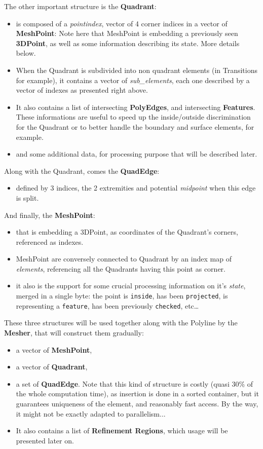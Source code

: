 \documentclass[10pt]{article}
\begin{document}
The other important structure is the \textbf{Quadrant}:
\begin{itemize}
\item is composed of a \textit{pointindex}, vector of 4 corner indices in a vector of \textbf{MeshPoint}: Note here that MeshPoint is embedding a previously seen \textbf{3DPoint}, as well as some information describing its state. More details below.
\item When the Quadrant is subdivided into non quadrant elements (in Transitions for example), it contains a vector of \textit{sub\_elements}, each one described by a vector of indexes as presented right above.
\item It also contains a list of intersecting \textbf{PolyEdges}, and intersecting \textbf{Features}. These informations are useful to speed up the inside/outside discrimination for the Quadrant or to better handle the boundary and surface elements, for example.
\item and some additional data, for processing purpose that will be described later.
\end{itemize}

Along with the Quadrant, comes the \textbf{QuadEdge}:
\begin{itemize}
\item defined by 3 indices, the 2 extremities and potential \textit{midpoint} when this edge is split.
\end{itemize}

And finally, the \textbf{MeshPoint}:
\begin{itemize}
\item that is embedding a 3DPoint, as coordinates of the Quadrant's corners, referenced as indexes.
\item MeshPoint are conversely connected to Quadrant by an index map of \textit{elements}, referencing all the Quadrants having this point as corner.
\item it also is the support for some crucial processing information on it's \textit{state}, merged in a single byte: the point is \verb?inside?, has been \verb?projected?, is representing a \verb?feature?, has been previously \verb?checked?, etc\ldots  
\end{itemize}

These three structures will be used together along with the Polyline by the \textbf{Mesher}, that will construct them gradually:
\begin{itemize}
\item a vector of \textbf{MeshPoint},
\item a vector of \textbf{Quadrant},
\item a set of \textbf{QuadEdge}. Note that this kind of structure is costly (quasi 30\% of the whole computation time), as insertion is done in a sorted container, but it guarantees uniqueness of the element, and reasonably fast access. By the way, it might not be exactly adapted to parallelism...
\item It also contains a list of \textbf{Refinement Regions}, which usage will be presented later on.
\end{itemize}
\end{document}
